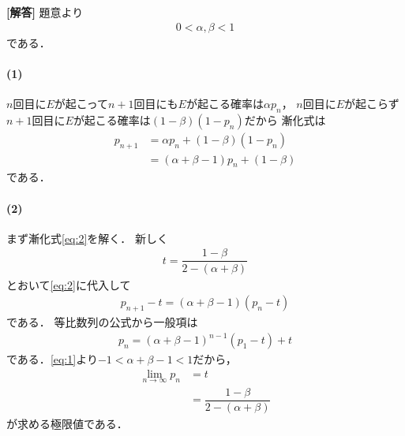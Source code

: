 \documentclass[../../main.tex]{subfiles}
\begin{document}
\begin{oframed}
  
\end{oframed}

{\bf [解答]}
題意より
\begin{align}
  0<\alpha,\beta<1 \label{eq:1}
\end{align}
である．

\paragraph{(1)}
$n$回目に$E$が起こって$n+1$回目にも$E$が起こる確率は$\alpha p_n$，
$n$回目に$E$が起こらず$n+1$回目に$E$が起こる確率は$(1-\beta)(1-p_n)$だから
漸化式は
\begin{align}
  p_{n+1}
  &= \alpha p_n + (1-\beta)(1-p_n) \\
  &= (\alpha+\beta-1)p_n + (1-\beta)  \label{eq:2}
\end{align}
である．

\paragraph{(2)}
まず漸化式\cref{eq:2}を解く．
新しく
\begin{align}
  t = \dfrac{1-\beta}{2-(\alpha+\beta)}
\end{align}
とおいて\cref{eq:2}に代入して
\begin{align}
  p_{n+1}-t = \left(\alpha+\beta-1\right)\left(p_n-t\right)
\end{align}
である．
等比数列の公式から一般項は
\begin{align}
  p_n = \left(\alpha+\beta-1\right)^{n-1}(p_1-t)+t
\end{align}
である．\cref{eq:1}より$-1<\alpha+\beta-1<1$だから，
\begin{align}
  \lim_{n\to\infty} p_n
  &= t \\
  &= \dfrac{1-\beta}{2-(\alpha+\beta)}
\end{align}
が求める極限値である．
\end{document}
